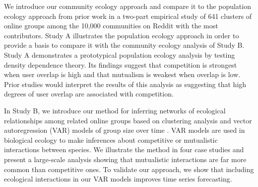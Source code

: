 \documentclass[letterpaper]{article}\usepackage[]{graphicx}\usepackage[]{color}
\begin{document}




We introduce our community ecology approach and compare it to the population ecology approach from prior work in a two-part empirical study of 641 clusters of online groups among the 10,000 communities on Reddit with the most contributors. 
Study A illustrates the population ecology approach in order to provide a basis to compare it with the community ecology analysis of Study B.
Study A demonstrates a prototypical population ecology analysis by testing density dependence theory. Its findings suggest that competition is strongest when user overlap is high and that mutualism is weakest when overlap is low. 
Prior studies would interpret the results of this analysis as suggesting that high degrees of user overlap are associated with competition. 

In Study B, we introduce our method for inferring networks of ecological relationships among related online groups based on clustering analysis and vector autoregression (VAR) models of group size over time \cite{ives_estimating_2003}. VAR models are used in biological ecology to make inferences about competitive or mutualistic interactions between species. 
We illustrate the method in four case studies and present a large-scale analysis showing that mutualistic interactions are far more common than competitive ones.  To validate our approach, we show that including ecological interactions in our VAR models improves time series forecasting. 


\end{document}
